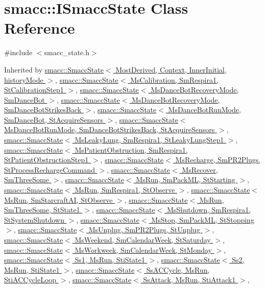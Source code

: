 \hypertarget{classsmacc_1_1ISmaccState}{}\section{smacc\+:\+:I\+Smacc\+State Class Reference}
\label{classsmacc_1_1ISmaccState}


{\ttfamily \#include $<$smacc\+\_\+state.\+h$>$}



Inherited by \hyperlink{classsmacc_1_1SmaccState}{smacc\+::\+Smacc\+State$<$ Most\+Derived, Context, Inner\+Initial, history\+Mode $>$}, \hyperlink{classsmacc_1_1SmaccState}{smacc\+::\+Smacc\+State$<$ Ms\+Calibration, Sm\+Respira1, St\+Calibration\+Step1 $>$}, \hyperlink{classsmacc_1_1SmaccState}{smacc\+::\+Smacc\+State$<$ Ms\+Dance\+Bot\+Recovery\+Mode, Sm\+Dance\+Bot $>$}, \hyperlink{classsmacc_1_1SmaccState}{smacc\+::\+Smacc\+State$<$ Ms\+Dance\+Bot\+Recovery\+Mode, Sm\+Dance\+Bot\+Strikes\+Back $>$}, \hyperlink{classsmacc_1_1SmaccState}{smacc\+::\+Smacc\+State$<$ Ms\+Dance\+Bot\+Run\+Mode, Sm\+Dance\+Bot, St\+Acquire\+Sensors $>$}, \hyperlink{classsmacc_1_1SmaccState}{smacc\+::\+Smacc\+State$<$ Ms\+Dance\+Bot\+Run\+Mode, Sm\+Dance\+Bot\+Strikes\+Back, St\+Acquire\+Sensors $>$}, \hyperlink{classsmacc_1_1SmaccState}{smacc\+::\+Smacc\+State$<$ Ms\+Leaky\+Lung, Sm\+Respira1, St\+Leaky\+Lung\+Step1 $>$}, \hyperlink{classsmacc_1_1SmaccState}{smacc\+::\+Smacc\+State$<$ Ms\+Patient\+Obstruction, Sm\+Respira1, St\+Patient\+Obstruction\+Step1 $>$}, \hyperlink{classsmacc_1_1SmaccState}{smacc\+::\+Smacc\+State$<$ Ms\+Recharge, Sm\+P\+R2\+Plugs, St\+Process\+Recharge\+Command $>$}, \hyperlink{classsmacc_1_1SmaccState}{smacc\+::\+Smacc\+State$<$ Ms\+Recover, Sm\+Three\+Some $>$}, \hyperlink{classsmacc_1_1SmaccState}{smacc\+::\+Smacc\+State$<$ Ms\+Run, Sm\+Pack\+M\+L, St\+Starting $>$}, \hyperlink{classsmacc_1_1SmaccState}{smacc\+::\+Smacc\+State$<$ Ms\+Run, Sm\+Respira1, St\+Observe $>$}, \hyperlink{classsmacc_1_1SmaccState}{smacc\+::\+Smacc\+State$<$ Ms\+Run, Sm\+Starcraft\+A\+I, St\+Observe $>$}, \hyperlink{classsmacc_1_1SmaccState}{smacc\+::\+Smacc\+State$<$ Ms\+Run, Sm\+Three\+Some, St\+State1 $>$}, \hyperlink{classsmacc_1_1SmaccState}{smacc\+::\+Smacc\+State$<$ Ms\+Shutdown, Sm\+Respira1, St\+System\+Shutdown $>$}, \hyperlink{classsmacc_1_1SmaccState}{smacc\+::\+Smacc\+State$<$ Ms\+Stop, Sm\+Pack\+M\+L, St\+Stopping $>$}, \hyperlink{classsmacc_1_1SmaccState}{smacc\+::\+Smacc\+State$<$ Ms\+Unplug, Sm\+P\+R2\+Plugs, St\+Unplug $>$}, \hyperlink{classsmacc_1_1SmaccState}{smacc\+::\+Smacc\+State$<$ Ms\+Weekend, Sm\+Calendar\+Week, St\+Saturday $>$}, \hyperlink{classsmacc_1_1SmaccState}{smacc\+::\+Smacc\+State$<$ Ms\+Workweek, Sm\+Calendar\+Week, St\+Monday $>$}, \hyperlink{classsmacc_1_1SmaccState}{smacc\+::\+Smacc\+State$<$ Ss1, Ms\+Run, Sti\+State1 $>$}, \hyperlink{classsmacc_1_1SmaccState}{smacc\+::\+Smacc\+State$<$ Ss2, Ms\+Run, Sti\+State1 $>$}, \hyperlink{classsmacc_1_1SmaccState}{smacc\+::\+Smacc\+State$<$ Ss\+A\+C\+Cycle, Ms\+Run, Sti\+A\+C\+Cycle\+Loop $>$}, \hyperlink{classsmacc_1_1SmaccState}{smacc\+::\+Smacc\+State$<$ Ss\+Attack, Ms\+Run, Sti\+Attack1 $>$}, 